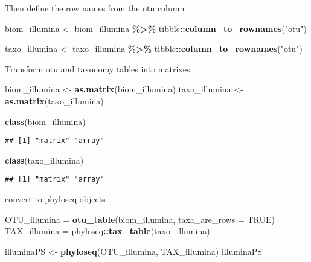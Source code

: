 \documentclass[
]{article}
\newenvironment{Shaded}{\begin{snugshade}}{\end{snugshade}}
\newcommand{\AttributeTok}[1]{\textcolor[rgb]{0.13,0.29,0.53}{#1}}
\newcommand{\ConstantTok}[1]{\textcolor[rgb]{0.56,0.35,0.01}{#1}}
\newcommand{\FunctionTok}[1]{\textcolor[rgb]{0.13,0.29,0.53}{\textbf{#1}}}
\newcommand{\NormalTok}[1]{#1}
\newcommand{\OtherTok}[1]{\textcolor[rgb]{0.56,0.35,0.01}{#1}}
\newcommand{\SpecialCharTok}[1]{\textcolor[rgb]{0.81,0.36,0.00}{\textbf{#1}}}
\newcommand{\StringTok}[1]{\textcolor[rgb]{0.31,0.60,0.02}{#1}}
\begin{document}
Then define the row names from the otu column

\begin{Shaded}
\begin{Highlighting}[]
\NormalTok{biom\_illumina }\OtherTok{\textless{}{-}}\NormalTok{ biom\_illumina }\SpecialCharTok{\%\textgreater{}\%}
\NormalTok{  tibble}\SpecialCharTok{::}\FunctionTok{column\_to\_rownames}\NormalTok{(}\StringTok{"otu"}\NormalTok{) }

\NormalTok{taxo\_illumina }\OtherTok{\textless{}{-}}\NormalTok{ taxo\_illumina }\SpecialCharTok{\%\textgreater{}\%}
\NormalTok{  tibble}\SpecialCharTok{::}\FunctionTok{column\_to\_rownames}\NormalTok{(}\StringTok{"otu"}\NormalTok{) }
\end{Highlighting}
\end{Shaded}

Transform otu and taxonomy tables into matrixes

\begin{Shaded}
\begin{Highlighting}[]
\NormalTok{biom\_illumina }\OtherTok{\textless{}{-}} \FunctionTok{as.matrix}\NormalTok{(biom\_illumina)}
\NormalTok{taxo\_illumina }\OtherTok{\textless{}{-}} \FunctionTok{as.matrix}\NormalTok{(taxo\_illumina)}

\FunctionTok{class}\NormalTok{(biom\_illumina)}
\end{Highlighting}
\end{Shaded}

\begin{verbatim}
## [1] "matrix" "array"
\end{verbatim}

\begin{Shaded}
\begin{Highlighting}[]
\FunctionTok{class}\NormalTok{(taxo\_illumina) }
\end{Highlighting}
\end{Shaded}

\begin{verbatim}
## [1] "matrix" "array"
\end{verbatim}

convert to phyloseq objects

\begin{Shaded}
\begin{Highlighting}[]
\NormalTok{OTU\_illumina }\OtherTok{=} \FunctionTok{otu\_table}\NormalTok{(biom\_illumina, }\AttributeTok{taxa\_are\_rows =} \ConstantTok{TRUE}\NormalTok{)}
\NormalTok{TAX\_illumina }\OtherTok{=}\NormalTok{ phyloseq}\SpecialCharTok{::}\FunctionTok{tax\_table}\NormalTok{(taxo\_illumina)}

\NormalTok{illuminaPS }\OtherTok{\textless{}{-}} \FunctionTok{phyloseq}\NormalTok{(OTU\_illumina, TAX\_illumina)}
\NormalTok{illuminaPS}
\end{Highlighting}
\end{Shaded}
\end{document}
